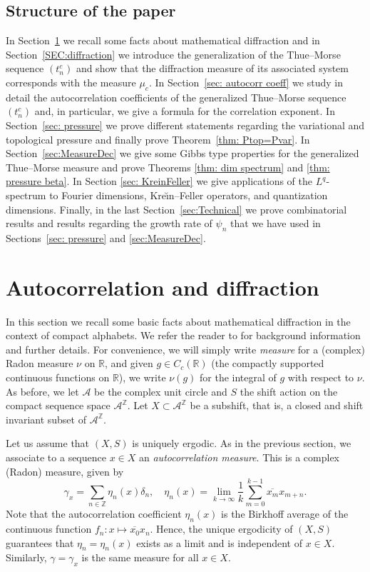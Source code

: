 \documentclass[11pt,reqno]{amsart}
\theoremstyle{plain}
\theoremstyle{definition}
\newcommand{\Z}{{\mathbb Z}}
\newcommand{\R}{{\mathbb R}}
\newcommand{\mc}{\mathcal}
\newcommand{\ts}{\hspace{0.5pt}}
\begin{document}
\subsection{Structure of the paper}
In Section~\ref{sec: autocorr} we recall some facts about mathematical diffraction and in Section~\ref{SEC:diffraction} we introduce the generalization of the Thue{\ts}--Morse sequence $(t^c_n)$ and show that the diffraction measure of its associated system corresponds with the measure $\mu_c$. In Section~\ref{sec: autocorr coeff} we study in detail the autocorrelation coefficients of the generalized Thue{\ts}--Morse sequence $(t^c_n)$ and, in particular, we give a formula for the correlation exponent.
In Section~\ref{sec: pressure} we prove different statements regarding the variational and topological pressure and finally prove Theorem~\ref{thm: Ptop=Pvar}. 
In Section~\ref{sec:MeasureDec} we give some Gibbs type properties for the generalized Thue{\ts}--Morse measure and prove Theorems \ref{thm: dim spectrum} and \ref{thm: pressure beta}.
In Section \ref{sec: KreinFeller} we give 
applications of the $L^q$-spectrum to Fourier dimensions, Kre\u{\i}n--Feller operators, and quantization dimensions. 
Finally, in the last Section~\ref{sec:Technical} we prove 
combinatorial results and results regarding the growth rate of $\psi_n$ that we have used in Sections~\ref{sec: pressure} and \ref{sec:MeasureDec}.









\section{Autocorrelation and diffraction}\label{sec: autocorr}
In this section we recall some basic facts about mathematical diffraction in the context of compact alphabets. We refer the reader to \cite{baake} for background information and further details.
For convenience, we will simply write \emph{measure} for a (complex) Radon measure $\nu$ on $\R$, and given $g \in C_c(\R)$ (the compactly supported continuous functions on $\R$), we write $\nu(g)$ for the integral of $g$ with respect to $\nu$.
As before, we let $\mc A$ be the complex unit circle and $S$ the shift action on the compact sequence space $\mc A^{\Z}$. Let $X \subset \mc A^{\Z}$ be a subshift, that is, a closed and shift invariant subset of $\mc A^{\Z}$. 

Let us assume that $(X,S)$ is uniquely ergodic.
As in the previous section, we associate to a sequence $x \in X$ an \emph{autocorrelation measure}. This is a complex (Radon) measure, given by
\[
\gamma_x = \sum_{n \in \Z} \eta_n(x) \delta_n
, \quad
\eta_n(x) = \lim_{k \to \infty} \frac{1}{k} \sum_{m=0}^{k-1} \overline{x_m} x_{m+n}.
\]
Note that the autocorrelation coefficient $\eta_n(x)$ is the Birkhoff average of the continuous function $f_n \colon x \mapsto \overline{x_0} x_n$. Hence, the unique ergodicity of $(X,S)$ guarantees that $\eta_n = \eta_n(x)$ exists as a limit and is independent of $x \in X$. Similarly, $\gamma = \gamma_x$ is the same measure for all $x \in X$. 
\end{document}
